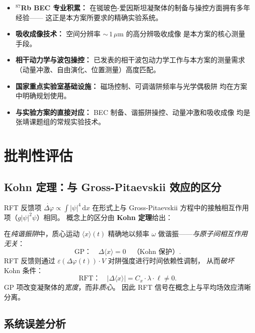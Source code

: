 \documentclass[a4paper,11pt]{article}
\begin{document}
\begin{itemize}
  \item \textbf{$^{87}$Rb BEC 专业积累：}
    在铷玻色-爱因斯坦凝聚体的制备与操控方面拥有多年经验——
    这正是本方案所要求的精确实验系统。
  \item \textbf{吸收成像技术：}
    空间分辨率 ${\sim}\,1\,\mu\mathrm{m}$ 的高分辨吸收成像
    是本方案的核心测量手段。
  \item \textbf{相干动力学与波包操控：}
    已发表的相干波包动力学工作与本方案的测量需求
    （动量冲激、自由演化、位置测量）高度匹配。
  \item \textbf{国家重点实验室基础设施：}
    磁场控制、可调谐阱频率与光学偶极阱
    均在方案中明确规划使用。
  \item \textbf{与实验方案的直接对应：}
    BEC 制备、谐振阱操控、动量冲激和吸收成像
    均是张靖课题组的常规实验技术。
\end{itemize}

\section{批判性评估}

\subsection{Kohn 定理：与 Gross-Pitaevskii 效应的区分}

RFT 反馈项 $\dot{\Delta\varphi} \propto \int |\psi|^4\,\mathrm{d}x$
在形式上与 Gross-Pitaevskii 方程中的接触相互作用项（$g|\psi|^2\psi$）相同。
概念上的区分由 \textbf{Kohn 定理}给出：

在\emph{纯谐振阱}中，质心运动 $\langle x\rangle(t)$ 精确地以频率 $\omega$
做谐振——\emph{与原子间相互作用无关}：
\[
  \text{GP：} \quad \Delta\langle x\rangle = 0 \quad\text{（Kohn 保护）}.
\]
RFT 反馈则通过 $\varepsilon(\Delta\varphi(t)) \cdot V$ 对阱强度进行时间依赖性调制，
从而\emph{破坏} Kohn 条件：
\[
  \text{RFT：} \quad |\Delta\langle x\rangle| = C_x \cdot \lambda \cdot \ell \neq 0.
\]
GP 项改变凝聚体的\emph{宽度}，而非\emph{质心}。
因此 RFT 信号在概念上与平均场效应清晰分离。

\subsection{系统误差分析}
\end{document}
